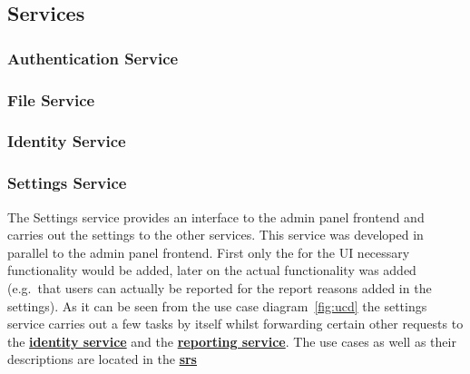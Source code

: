 \subsection{Services}\label{subsec:services2}

\subsubsection{Authentication Service}

\subsubsection{File Service}

\subsubsection{Identity Service}
\label{subsubsec:identitySer}

\subsubsection{Settings Service}\label{subsubsec:settingsSer}

The Settings service provides an interface to the admin panel frontend and carries out the settings to the other
services.
This service was developed in parallel to the admin panel frontend. %
First only the for the UI necessary functionality would be added, later on the actual functionality was added
(e.g.\ that users can actually be reported for the report reasons added in the settings).
As it can be seen from the use case diagram~\ref{fig:ucd} the settings service carries out a few tasks by itself whilst
forwarding certain other requests to the \hyperref[subsubsec:identitySer]{\textbf{identity service}} and the
\hyperref[subsubsec:reportingSer]{\textbf{reporting service}}.
The use cases as well as their descriptions are located in the
\hyperref[ch:software-requirements-specification-(srs)]{\textbf{\ac{srs}}}

